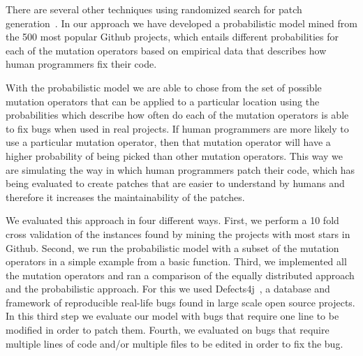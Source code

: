 \documentclass[conference]{IEEEtran}
\newcommand{\todo}[1]
  {{\scriptsize \textbf{\color{red} {#1}}}}
\begin{document}
There are several other techniques using randomized search
for patch generation~\cite{arcuri08,bradbury10,Qi14,Weimer13}. In our approach we have developed a probabilistic model mined 
from the 500 most popular Github projects, which 
entails different probabilities for each of the mutation operators based on 
empirical data that describes how human programmers fix their code.

With the probabilistic model we are able to chose from the set of possible
mutation operators that can be applied to a particular location using the
probabilities which describe how often do each of the mutation operators is able
to fix bugs when used in real projects. If human programmers are more likely to
use a particular mutation operator, then that mutation operator will have a
higher probability of being picked than other mutation operators. This way we 
are simulating the way in which human programmers patch their code, which has 
being evaluated to create patches that are easier to understand by humans and 
therefore it increases the maintainability of the patches. 

We evaluated this approach in four different ways. First, we perform a 10 fold cross validation of the instances found by mining the projects with most stars in Github. Second, we run the probabilistic model with a subset of the mutation operators in a simple example from a basic function. Third, we implemented all the mutation operators and ran a comparison of the equally distributed approach and the probabilistic approach. For this we used Defects4j~\cite{just14}, a database and framework of reproducible real-life bugs found in large scale open source projects. In this third step we evaluate our model with bugs that require one line to be modified in order to patch them. Fourth, we evaluated on bugs that require multiple lines of code and/or multiple files to be edited in order to fix the bug.




%
%
\end{document}
